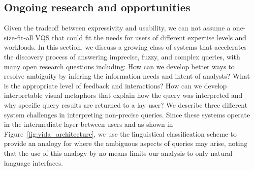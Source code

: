 \subsection{Ongoing research and opportunities}
\par Given the tradeoff between expressivity and usability, we can not assume a one-size-fit-all VQS that could fit the needs for users of different expertise levels and workloads. In this section, we discuss a growing class of systems that accelerates the discovery process of answering imprecise, fuzzy, and complex queries, with many open research questions including: How can we develop better ways to resolve ambiguity by infering the information needs and intent of analysts? What is the appropriate level of feedback and interactions? How can we develop interpretable visual metaphors that explain how the query was interpreted and why specific query results are returned to a lay user? We describe three different system challenges in interpreting non-precise queries. Since these systems operate in the intermediate layer between users and \vidaql as shown in Figure~\ref{fig:vida_architecture}, we use the linguistical classification scheme to provide an analogy for where the ambiguous aspects of queries may arise, noting that the use of this analogy by no means limits our analysis to only natural language interfaces.

